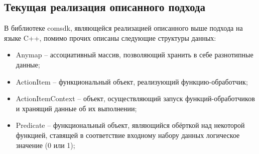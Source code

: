 ﻿%
\subsection{Текущая реализация описанного подхода}
\begin{frame}
	В библиотеке comsdk, являющейся реализацией описанного выше подхода на языке C++, помимо прочих описаны следующие структуры данных:
	\begin{itemize}
		\item \textsf{Anymap} -- ассоциативный массив, позволяющий хранить в себе разнотипные данные;
		\item \textsf{ActionItem} -- функциональный объект, реализующий функцию-обработчик;
		\item \textsf{ActionItemContext} -- объект, осуществляющий запуск функций-обработчиков и хранящий данные об их выполнении;
		\item \textsf{Predicate} -- функциональный объект, являющийся обёрткой над некоторой функцией, ставящей в соответствие входному набору данных логическое значение (0 или 1);
	\end{itemize}	
\end{frame}

